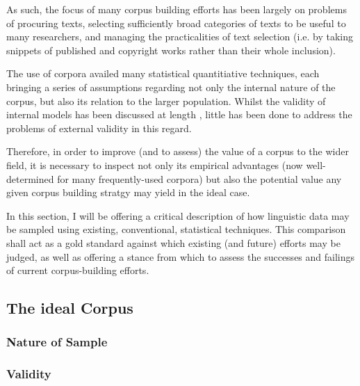 As such, the focus of many corpus building efforts 
has been largely on problems of procuring texts, selecting sufficiently broad categories of texts to be useful to many researchers, and managing the practicalities of text selection (i.e. by taking snippets of published and copyright works rather than their whole inclusion).

The use of corpora availed many statistical quantitiative techniques, each bringing a series of assumptions regarding not only the internal nature of the corpus, but also its relation to the larger population.  Whilst the validity of internal models has been discussed at length
, little has been done to address the problems of external validity in this regard.

Therefore, in order to improve (and to assess) the value of a corpus to the wider field, it is necessary to inspect not only its empirical advantages (now well-determined for many frequently-used corpora) but also the potential value any given corpus building stratgy may yield in the ideal case.

In this section, I will be offering a critical description of how linguistic data may be sampled using existing, conventional, statistical techniques.  This comparison shall act as a gold standard against which existing (and future) efforts may be judged, as well as offering a stance from which to assess the successes and failings of current corpus-building efforts.



\subsection{The ideal Corpus}
\label{sec:sub:ideal-corpus}

\subsubsection{Nature of Sample}
\subsubsection{Validity}
